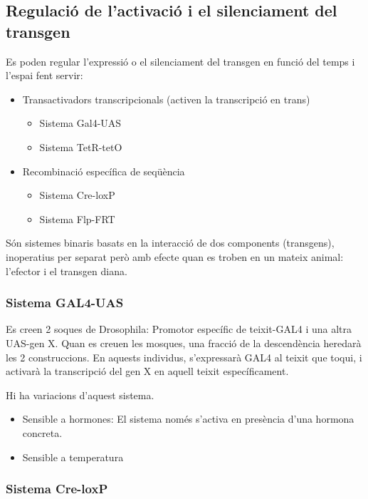 

\subsection{Regulació de l'activació i el silenciament del transgen}
\label{sec:regul-de-lact}

Es poden regular l'expressió o el silenciament del transgen en funció
del temps i l'espai fent servir:
\begin{itemize}
\item Transactivadors transcripcionals (activen la transcripció en
  trans)
  \begin{itemize}
  \item Sistema Gal4-UAS
  \item Sistema TetR-tetO
  \end{itemize}
\item Recombinació específica de seqüència
  \begin{itemize}
  \item Sistema Cre-loxP
  \item Sistema Flp-FRT
  \end{itemize}
\end{itemize}

Són sistemes binaris basats en la interacció de dos components
(transgens), inoperatius per separat però amb efecte quan es troben en
un mateix animal: l'efector i el transgen diana.

\subsubsection{Sistema GAL4-UAS}
\label{sec:sistema-gal4-uas}
Es creen 2 soques de Drosophila: Promotor específic de teixit-GAL4 i
una altra UAS-gen X. Quan es creuen les mosques, una fracció de la
descendència heredarà les 2 construccions. En aquests individus,
s'expressarà GAL4 al teixit que toqui, i activarà la transcripció del
gen X en aquell teixit específicament.

Hi ha variacions d'aquest sistema. 
\begin{itemize}
\item Sensible a hormones: El sistema només s'activa en presència
  d'una hormona concreta.
\item Sensible a temperatura
\end{itemize}

\subsubsection{Sistema Cre-loxP}
\label{sec:sistema-cre-loxp}

